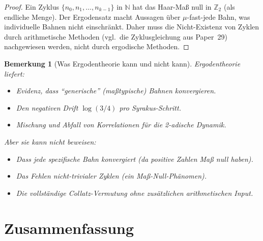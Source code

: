 \documentclass[12pt,a4paper]{article}
\newtheorem{remark}[theorem]{Bemerkung}
\begin{document}
\begin{proof}
Ein Zyklus $\{n_0, n_1, \ldots, n_{k-1}\}$ in $\mathbb{N}$ hat das Haar-Maß null in
$\mathbb{Z}_2$ (als endliche Menge). Der Ergodensatz macht Aussagen über $\mu$-fast-jede
Bahn, was individuelle Bahnen nicht einschränkt. Daher muss die Nicht-Existenz von
Zyklen durch arithmetische Methoden (vgl.\ die Zyklusgleichung aus Paper~29) nachgewiesen
werden, nicht durch ergodische Methoden.
\end{proof}

\begin{remark}[Was Ergodentheorie kann und nicht kann]\label{rem:ergodisch_grenzen}
Ergodentheorie liefert:
\begin{itemize}
  \item Evidenz, dass ``generische'' (maßtypische) Bahnen konvergieren.
  \item Den negativen Drift $\log(3/4)$ pro Syrakus-Schritt.
  \item Mischung und Abfall von Korrelationen für die 2-adische Dynamik.
\end{itemize}
Aber sie kann nicht beweisen:
\begin{itemize}
  \item Dass jede \emph{spezifische} Bahn konvergiert (da positive Zahlen Maß null haben).
  \item Das Fehlen nicht-trivialer Zyklen (ein Maß-Null-Phänomen).
  \item Die vollständige Collatz-Vermutung ohne zusätzlichen arithmetischen Input.
\end{itemize}
\end{remark}

\section{Zusammenfassung}
\end{document}
